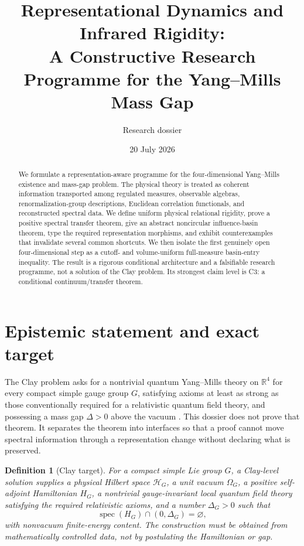 \documentclass[11pt]{article}
\title{Representational Dynamics and Infrared Rigidity:\\
A Constructive Research Programme for the Yang--Mills Mass Gap}
\author{Research dossier}
\date{20 July 2026}
\newcommand{\spec}{\operatorname{spec}}
\newtheorem{definition}{Definition}[section]
\theoremstyle{remark}
\begin{document}
\maketitle

\begin{abstract}
We formulate a representation-aware programme for the four-dimensional
Yang--Mills existence and mass-gap problem.  The physical theory is treated as
coherent information transported among regulated measures, observable
algebras, renormalization-group descriptions, Euclidean correlation
functionals, and reconstructed spectral data.  We define uniform physical
relational rigidity, prove a positive spectral transfer theorem, give an
abstract noncircular influence-basin theorem, type the required representation
morphisms, and exhibit counterexamples that invalidate several common
shortcuts.  We then isolate the first genuinely open four-dimensional step as
a cutoff- and volume-uniform full-measure basin-entry inequality.  The result
is a rigorous conditional architecture and a falsifiable research programme,
not a solution of the Clay problem.  Its strongest claim level is C3: a
conditional continuum/transfer theorem.
\end{abstract}

\tableofcontents

\section{Epistemic statement and exact target}

The Clay problem asks for a nontrivial quantum Yang--Mills theory on
$\mathbb R^4$ for every compact simple gauge group $G$, satisfying axioms at
least as strong as those conventionally required for a relativistic quantum
field theory, and possessing a mass gap $\Delta>0$ above the vacuum
\cite{JaffeWitten}.  This dossier does not prove that theorem.  It separates
the theorem into interfaces so that a proof cannot move spectral information
through a representation change without declaring what is preserved.

\begin{definition}[Clay target]
For a compact simple Lie group $G$, a \emph{Clay-level solution} supplies a
physical Hilbert space $\mathcal H_G$, a unit vacuum $\Omega_G$, a positive
self-adjoint Hamiltonian $H_G$, a nontrivial gauge-invariant local quantum
field theory satisfying the required relativistic axioms, and a number
$\Delta_G>0$ such that
\[
  \spec(H_G)\cap(0,\Delta_G)=\varnothing,
\]
with nonvacuum finite-energy content.  The construction must be obtained from
mathematically controlled data, not by postulating the Hamiltonian or gap.
\end{definition}
\end{document}
